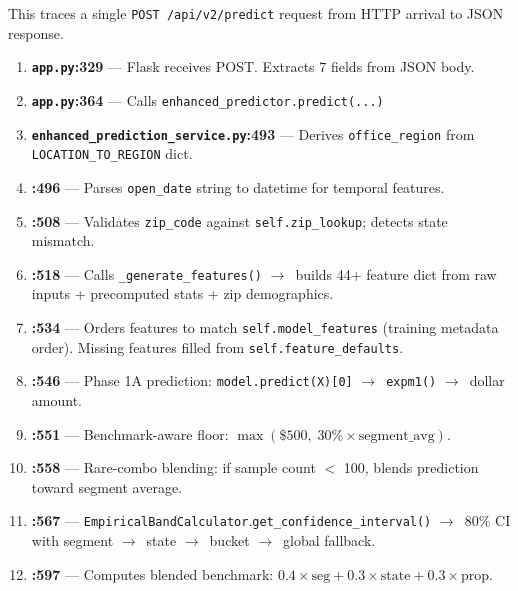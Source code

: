 \documentclass[11pt,a4paper]{article}
\newcommand{\file}[1]{\texttt{\color{gssblue!70!black}#1}}
\newcommand{\func}[1]{\texttt{\color{gssgreen!80!black}#1}}
\newcommand{\cls}[1]{\texttt{\color{uipurple}#1}}
\newcommand{\arrow}{$\rightarrow$}
\begin{document}
This traces a single \texttt{POST /api/v2/predict} request from HTTP arrival to JSON
response.

\begin{enumerate}[leftmargin=2em]
    \item \textbf{\file{app.py}:329} --- Flask receives POST. Extracts 7 fields from JSON body.

    \item \textbf{\file{app.py}:364} --- Calls \func{enhanced\_predictor.predict(...)}

    \item \textbf{\file{enhanced\_prediction\_service.py}:493} --- Derives \texttt{office\_region} from \texttt{LOCATION\_TO\_REGION} dict.

    \item \textbf{:496} --- Parses \texttt{open\_date} string to datetime for temporal features.

    \item \textbf{:508} --- Validates \texttt{zip\_code} against \texttt{self.zip\_lookup}; detects state mismatch.

    \item \textbf{:518} --- Calls \func{\_generate\_features()} \arrow\ builds 44+ feature dict from raw inputs + precomputed stats + zip demographics.

    \item \textbf{:534} --- Orders features to match \texttt{self.model\_features} (training metadata order). Missing features filled from \texttt{self.feature\_defaults}.

    \item \textbf{:546} --- Phase 1A prediction: \texttt{model.predict(X)[0]} \arrow\ \texttt{expm1()} \arrow\ dollar amount.

    \item \textbf{:551} --- Benchmark-aware floor: $\max(\$500,\; 30\% \times \text{segment\_avg})$.

    \item \textbf{:558} --- Rare-combo blending: if sample count $<$ 100, blends prediction toward segment average.

    \item \textbf{:567} --- \cls{EmpiricalBandCalculator}.\func{get\_confidence\_interval()} \arrow\ 80\% CI with segment \arrow\ state \arrow\ bucket \arrow\ global fallback.

    \item \textbf{:597} --- Computes blended benchmark: $0.4 \times \text{seg} + 0.3 \times \text{state} + 0.3 \times \text{prop}$.


\end{enumerate}
\end{document}
